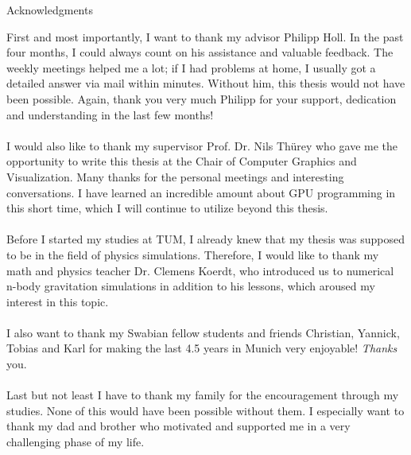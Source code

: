 \thispagestyle{empty}

\vspace*{20mm}

\begin{center}
{ Acknowledgments}
\end{center}

\vspace{10mm}
First and most importantly, I want to thank my advisor Philipp Holl. In the past four months, I could always count on his assistance and valuable feedback. The weekly meetings helped me a lot; if I had problems at home, I usually got a detailed answer via mail within minutes. Without him, this thesis would not have been possible. Again, thank you very much Philipp for your support, dedication and understanding in the last few months! \\\\
I would also like to thank my supervisor Prof. Dr. Nils Thürey who gave me the opportunity to write this thesis at the Chair of Computer Graphics and Visualization. Many thanks for the personal meetings and interesting conversations. I have learned an incredible amount about GPU programming in this short time, which I will continue to utilize beyond this thesis.\\\\
Before I started my studies at TUM, I already knew that my thesis was supposed to be in the field of physics simulations. Therefore, I would like to thank my math and physics teacher Dr. Clemens Koerdt, who introduced us to numerical n-body gravitation simulations in addition to his lessons, which aroused my interest in this topic.\\\\
I also want to thank my Swabian fellow students and friends Christian, Yannick, Tobias and Karl for making the last 4.5 years in Munich very enjoyable! \textit{Thanks} you.\\\\
Last but not least I have to thank my family for the encouragement through my studies. None of this would have been possible without them. I especially want to thank my dad and brother who motivated and supported me in a very challenging phase of my life.
\cleardoublepage{}
